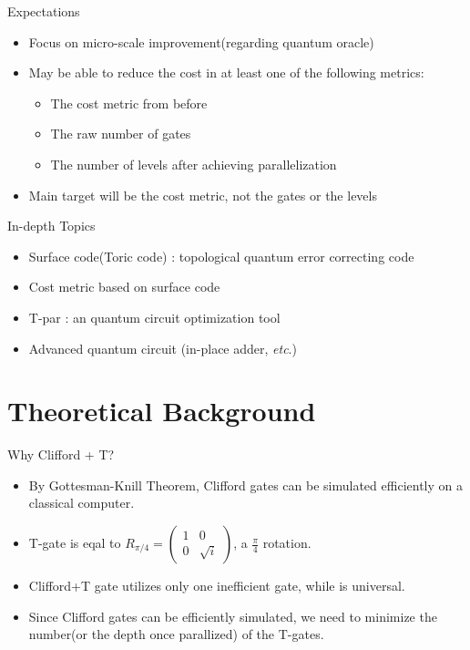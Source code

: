 \documentclass{beamer}
\begin{document}
    \begin{frame}{Expectations}
      \begin{itemize}
        \item Focus on micro-scale improvement(regarding quantum oracle)
        \item May be able to reduce the cost in at least one of the following metrics:
          \begin{itemize}
            \item The cost metric from before
            \item The raw number of gates
            \item The number of levels after achieving parallelization
          \end{itemize}
        \item Main target will be the cost metric, not the gates or the levels
      \end{itemize}
    \end{frame}
    
    \begin{frame}{In-depth Topics}
        \begin{itemize}
            \item Surface code(Toric code) : topological quantum error correcting code
            \item Cost metric based on surface code
            \item T-par \cite{amy2014polynomial} : an quantum circuit optimization tool
            \item Advanced quantum circuit (in-place adder, \textit{etc}.)
        \end{itemize}
    \end{frame}
    
    
    \section{Theoretical Background}
    \begin{frame}{Why Clifford + T?}
    	\begin{itemize}
    		\item By Gottesman-Knill Theorem, Clifford gates can be simulated efficiently on a classical computer.
    		\item T-gate is eqal to $R_{\pi/4}=\begin{pmatrix}1 & 0 \\ 0 & \sqrt{i}\end{pmatrix}$, a $\frac{\pi}{4}$ rotation.
    		\item Clifford+T gate utilizes only one inefficient gate, while is universal.
    		\item Since Clifford gates can be efficiently simulated, we need to minimize the number(or the depth once parallized) of the T-gates.
    	\end{itemize}
    \end{frame}
    
\end{document}
